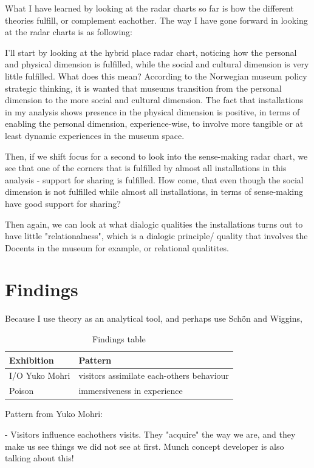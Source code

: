 What I have learned by looking at the radar charts so far is how the different theories fulfill, or complement eachother. The way I have gone forward in looking at the radar charts is as following:
\par I'll start by looking at the hybrid place radar chart, noticing how the personal and physical dimension is fulfilled, while the social and cultural dimension is very little fulfilled. What does this mean? According to the Norwegian museum policy strategic thinking, it is wanted that museums transition from the personal dimension to the more social and cultural dimension. The fact that installations in my analysis shows presence in the physical dimension is positive, in terms of enabling the personal dimension, experience-wise, to involve more tangible or at least dynamic experiences in the museum space.
\par Then, if we shift focus for a second to look into the sense-making radar chart, we see that one of the corners that is fulfilled by almost all installations in this analysis - support for sharing is fulfilled. How come, that even though the social dimension is not fulfilled while almost all installations, in terms of sense-making have good support for sharing? 

\par Then again, we can look at what dialogic qualities the installations turns out to have little "relationalness", which is a dialogic principle/ quality that involves the Docents in the museum for example, or relational qualitites.


\section{Findings}
Because I use theory as an analytical tool, and perhaps use Schön and Wiggins, 


\begin{table}[h]
\centering
\begin{tabular}{l | l}
\textbf{Exhibition} & \textbf{Pattern}\\
\hline
I/O Yuko Mohri & visitors assimilate each-others behaviour \\
Poison & immersiveness in experience

\end{tabular}
\caption{Findings table}
\label{tab:abc}
\end{table}

Pattern from Yuko Mohri:


- Visitors influence eachothers visits. They "acquire" the way we are, and they make us see things we did not see at first. Munch concept developer is also talking about this!

